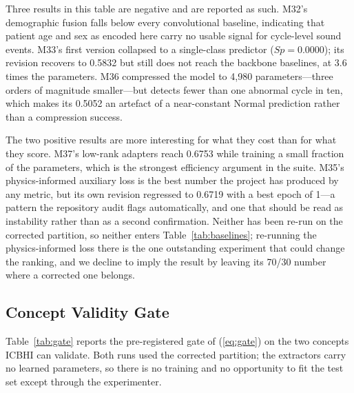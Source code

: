 \documentclass[journal,onecolumn]{IEEEtran}
\begin{document}
Three results in this table are negative and are reported as such. M32's demographic
fusion falls below every convolutional baseline, indicating that patient age and sex
as encoded here carry no usable signal for cycle-level sound events. M33's first
version collapsed to a single-class predictor ($Sp = 0.0000$); its revision recovers
to 0.5832 but still does not reach the backbone baselines, at 3.6 times the
parameters. M36 compressed the model to 4{,}980 parameters---three orders of
magnitude smaller---but detects fewer than one abnormal cycle in ten, which makes its
0.5052 an artefact of a near-constant Normal prediction rather than a compression
success.

The two positive results are more interesting for what they cost than for what they
score. M37's low-rank adapters reach 0.6753 while training a small fraction of the
parameters, which is the strongest efficiency argument in the suite. M35's
physics-informed auxiliary loss is the best number the project has produced by any
metric, but its own revision regressed to 0.6719 with a best epoch of 1---a pattern
the repository audit flags automatically, and one that should be read as instability
rather than as a second confirmation. Neither has been re-run on the corrected
partition, so neither enters Table~\ref{tab:baselines}; re-running the physics-informed
loss there is the one outstanding experiment that could change the ranking, and we
decline to imply the result by leaving its 70/30 number where a corrected one belongs.

\subsection{Concept Validity Gate}
\label{subsec:conceptgate}

Table~\ref{tab:gate} reports the pre-registered gate of (\ref{eq:gate}) on the two
concepts ICBHI can validate. Both runs used the corrected partition; the extractors
carry no learned parameters, so there is no training and no opportunity to fit the
test set except through the experimenter.
\end{document}
